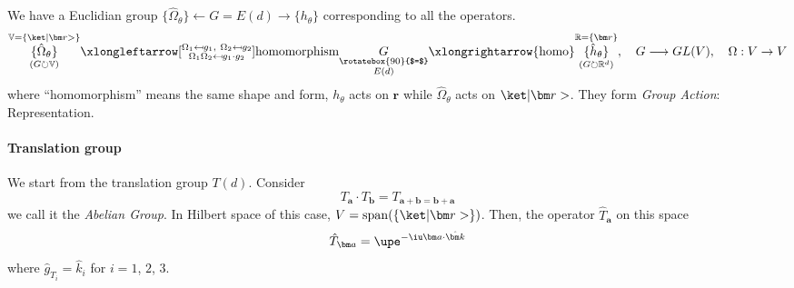 We have a Euclidian group
$\{\hat\Omega_\theta\} \leftarrow G = E(d) \to \{h_\theta\}$ corresponding to
all the operators.
\begin{equation}
  \overset{\mathbb V = \{\ket|\bm r>\}}
    {\underset{(G\circlearrowright\mathbb V)}{\{\hat\Omega_\theta\}}}
  \xlongleftarrow[\substack{
    \Omega_1\mapsfrom g_1,\ \Omega_2\mapsfrom g_2\\
    \Omega_1\Omega_2 \mapsfrom g_1 \cdot g_2
  }]{\text{homomorphism}}
  \underset{\substack{\rotatebox{90}{$=$}\\E(d)}}{G}
  \xlongrightarrow{\text{homo}}
  \overset{\mathbb R = \{\bm r\}}
    {\underset{(G\circlearrowright\mathbb R^d)}{\{\hat h_\theta\}}}, \quad
  G \longrightarrow GL(V), \quad \Omega: V \to V
\end{equation}
where ``homomorphism'' means the same shape and form,
$h_\theta$ acts on $\bm r$ while $\hat\Omega_\theta$ acts on $\ket|\bm r>$.
They form \emph{Group Action}: Representation.

\paragraph{Translation group}

We start from the translation group $T(d)$. Consider
\[
  T_{\bm a} \cdot T_{\bm b} = T_{\bm a + \bm b = \bm b + \bm a}
\]
we call it the \emph{Abelian Group}.
In Hilbert space of this case, $V = \operatorname{span}(\{\ket|\bm r>\})$.
Then, the operator $\hat T_{\bm a}$ on this space
\[
  \hat T_{\bm a} = \upe^{-\iu\bm a\cdot\hat{\bm k}}
\]
where $\hat g_{T_i} = \hat k_i$ for $i = 1$, $2$, $3$.
